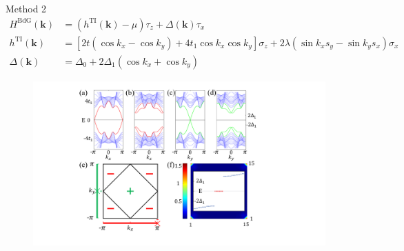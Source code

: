 \documentclass[10pt,aspectratio=169]{beamer} %
\begin{document}
\begin{frame}{Method 2}
\begin{equation}
\begin{aligned}
H^{\mathrm{BdG}}(\mathbf{k})&=(h^{\mathrm{TI}}(\mathbf{k})-\mu)\tau_z+\Delta(\mathbf{k})\tau_x\\
h^{\mathrm{TI}}(\mathbf{k})&=\left[2t(\cos k_x-\cos k_y)+4t_1\cos k_x\cos k_y\right]\sigma_z+2\lambda(\sin k_xs_y-\sin k_ys_x)\sigma_x\\
\Delta(\mathbf{k})&=\Delta_0+2\Delta_1(\cos k_x+\cos k_y)\label{hosc2}
\end{aligned}
\end{equation}
\begin{figure}[h]
\centering
\includegraphics[scale=0.3]{pic/fig13}\label{fig12}
\end{figure}
\end{frame}
\end{document}
